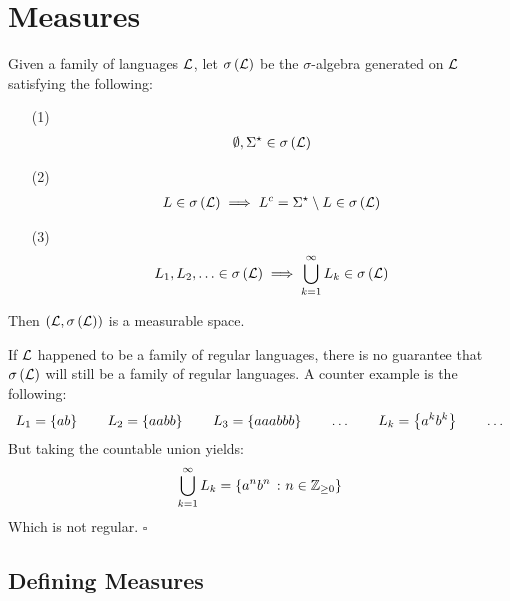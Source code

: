 \section{Measures}
Given a family of languages \(\mathcal{L}\),
let \(\sigma\left(\mathcal{L}\right)\) be the \(\sigma\)-algebra generated on
\(\mathcal{L}\) satisfying the following:

\begin{enumerate}
  \item[(1)]
    \begin{align*}
      \emptyset, \Sigma^\star \in \sigma\left(\mathcal{L}\right)
    \end{align*}

  \item[(2)]
    \begin{align*}
      L \in \sigma\left(\mathcal{L}\right)
        \implies
          L^c = \Sigma^\star \setminus L \in \sigma\left(\mathcal{L}\right)
    \end{align*}

  \item[(3)]
    \begin{align*}
      L_1, L_2, \ldots \in \sigma\left(\mathcal{L}\right)
        \implies
          \bigcup_{k = 1}^{\infty} L_k \in \sigma\left(\mathcal{L}\right)
    \end{align*}

\end{enumerate}

Then \(\left(\mathcal{L}, \sigma\left(\mathcal{L}\right)\right)\) is a measurable space.

\begin{remark}
If \(\mathcal{L}\) happened to be a family of regular languages,
there is no guarantee that \(\sigma\left(\mathcal{L}\right)\)
will still be a family of regular languages.
A counter example is the following:
\begin{align*}
  L_1 = \left\{ab\right\}
  \qquad
  L_2 = \left\{aabb\right\}
  \qquad
  L_3 = \left\{aaabbb\right\}
  \qquad
  \ldots
  \qquad
  L_k = \left\{a^k b^k\right\}
  \qquad
  \ldots
\end{align*}
But taking the countable union yields:
\begin{align*}
  \bigcup_{k = 1}^{\infty} L_k = \left\{a^n b^n \ \colon n \in \mathbb{Z}_{\geq 0}\right\}
\end{align*}
Which is not regular.
\hfill\(\square\)
\end{remark}


\subsection{Defining Measures}


